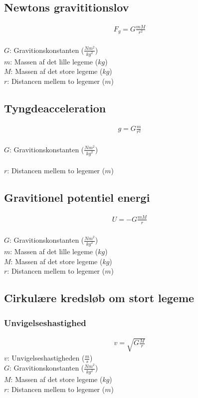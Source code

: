 \subsection{Newtons gravititionslov}
	\begin{align}
		F_g=G\frac{mM}{r^2}
	\end{align}
	\kraft\\
	$G$: Gravitionskonstanten ($\frac{Nm^2}{kg^2}$)\\
	$m$: Massen af det lille legeme ($kg$)\\
	$M$: Massen af det store legeme ($kg$)\\
	$r$: Distancen mellem to legemer ($m$)

\subsection{Tyngdeacceleration}
	\begin{align}
		g=G\frac{m}{r^2}
	\end{align}
	\tyngde\\
	$G$: Gravitionskonstanten ($\frac{Nm^2}{kg^2}$)\\
	\masse\\
	$r$: Distancen mellem to legemer ($m$)

\subsection{Gravitionel potentiel energi}
	\begin{align}
		U=-G\frac{mM}{r}
	\end{align}
	\pot\\
	$G$: Gravitionskonstanten ($\frac{Nm^2}{kg^2}$)\\
	$m$: Massen af det lille legeme ($kg$)\\
	$M$: Massen af det store legeme ($kg$)\\
	$r$: Distancen mellem to legemer ($m$)

\subsection{Cirkulære kredsløb om stort legeme}
	\subsubsection{Unvigelseshastighed}
		\begin{align}
			v=\sqrt{G\frac{M}{r}}
		\end{align}
		$v$: Unvigelseshastigheden ($\frac{m}{s}$)\\
		$G$: Gravitionskonstanten ($\frac{Nm^2}{kg^2}$)\\
		$M$: Massen af det store legeme ($kg$)\\
		$r$: Distancen mellem to legemer ($m$)

